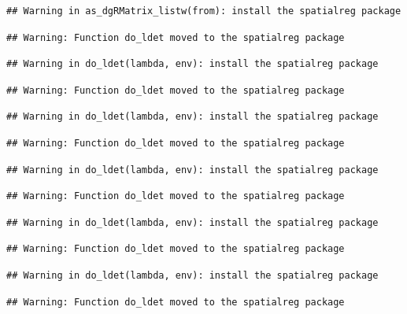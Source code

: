 \documentclass[11pt,]{article}
\begin{document}
\begin{verbatim}
## Warning in as_dgRMatrix_listw(from): install the spatialreg package
\end{verbatim}

\begin{verbatim}
## Warning: Function do_ldet moved to the spatialreg package
\end{verbatim}

\begin{verbatim}
## Warning in do_ldet(lambda, env): install the spatialreg package
\end{verbatim}

\begin{verbatim}
## Warning: Function do_ldet moved to the spatialreg package
\end{verbatim}

\begin{verbatim}
## Warning in do_ldet(lambda, env): install the spatialreg package
\end{verbatim}

\begin{verbatim}
## Warning: Function do_ldet moved to the spatialreg package
\end{verbatim}

\begin{verbatim}
## Warning in do_ldet(lambda, env): install the spatialreg package
\end{verbatim}

\begin{verbatim}
## Warning: Function do_ldet moved to the spatialreg package
\end{verbatim}

\begin{verbatim}
## Warning in do_ldet(lambda, env): install the spatialreg package
\end{verbatim}

\begin{verbatim}
## Warning: Function do_ldet moved to the spatialreg package
\end{verbatim}

\begin{verbatim}
## Warning in do_ldet(lambda, env): install the spatialreg package
\end{verbatim}

\begin{verbatim}
## Warning: Function do_ldet moved to the spatialreg package
\end{verbatim}
\end{document}
